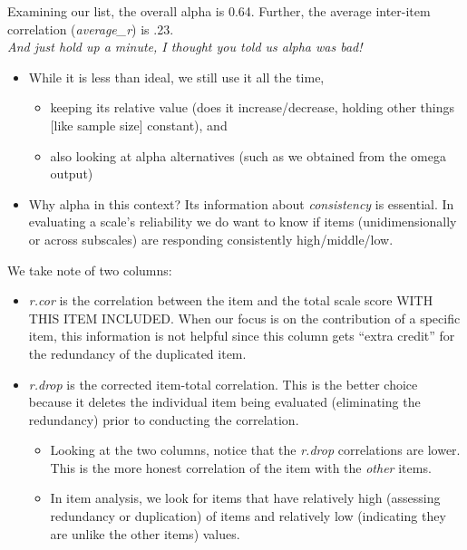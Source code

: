 \documentclass[
  english,
]{book}
\providecommand{\tightlist}{%
  \setlength{\itemsep}{0pt}\setlength{\parskip}{0pt}}
\begin{document}
Examining our list, the overall alpha is 0.64. Further, the average inter-item correlation (\emph{average\_r}) is .23.\\
\emph{And just hold up a minute, I thought you told us alpha was bad!}

\begin{itemize}
\tightlist
\item
  While it is less than ideal, we still use it all the time,

  \begin{itemize}
  \tightlist
  \item
    keeping its relative value (does it increase/decrease, holding other things {[}like sample size{]} constant), and
  \item
    also looking at alpha alternatives (such as we obtained from the omega output)
  \end{itemize}
\item
  Why alpha in this context? Its information about \emph{consistency} is essential. In evaluating a scale's reliability we do want to know if items (unidimensionally or across subscales) are responding consistently high/middle/low.
\end{itemize}

We take note of two columns:

\begin{itemize}
\tightlist
\item
  \emph{r.cor} is the correlation between the item and the total scale score WITH THIS ITEM INCLUDED. When our focus is on the contribution of a specific item, this information is not helpful since this column gets ``extra credit'' for the redundancy of the duplicated item.
\item
  \emph{r.drop} is the corrected item-total correlation. This is the better choice because it deletes the individual item being evaluated (eliminating the redundancy) prior to conducting the correlation.

  \begin{itemize}
  \tightlist
  \item
    Looking at the two columns, notice that the \emph{r.drop} correlations are lower. This is the more honest correlation of the item with the \emph{other} items.
  \item
    In item analysis, we look for items that have relatively high (assessing redundancy or duplication) of items and relatively low (indicating they are unlike the other items) values.
  \end{itemize}
\end{itemize}
\end{document}
